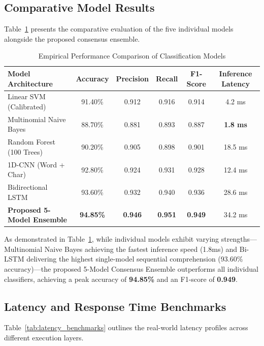 \documentclass[A4paper,12pt]{report}
\theoremstyle{plain}
\theoremstyle{definition}
\theoremstyle{remark}
\numberwithin{equation}{section}
\begin{document}
\subsection{Comparative Model Results}
Table~\ref{tab:model_results} presents the comparative evaluation of the five individual models alongside the proposed consensus ensemble.

\begin{table}[H]
\centering
\caption{Empirical Performance Comparison of Classification Models}
\label{tab:model_results}
\renewcommand{\arraystretch}{1.4}
\begin{tabular}{|l|c|c|c|c|c|}
\hline
\textbf{Model Architecture} & \textbf{Accuracy} & \textbf{Precision} & \textbf{Recall} & \textbf{F1-Score} & \textbf{Inference Latency} \\ \hline
Linear SVM (Calibrated) & 91.40\% & 0.912 & 0.916 & 0.914 & 4.2 ms \\ \hline
Multinomial Naive Bayes & 88.70\% & 0.881 & 0.893 & 0.887 & \textbf{1.8 ms} \\ \hline
Random Forest (100 Trees) & 90.20\% & 0.905 & 0.898 & 0.901 & 18.5 ms \\ \hline
1D-CNN (Word + Char) & 92.80\% & 0.924 & 0.931 & 0.928 & 12.4 ms \\ \hline
Bidirectional LSTM & 93.60\% & 0.932 & 0.940 & 0.936 & 28.6 ms \\ \hline
\textbf{Proposed 5-Model Ensemble} & \textbf{94.85\%} & \textbf{0.946} & \textbf{0.951} & \textbf{0.949} & 34.2 ms \\ \hline
\end{tabular}
\end{table}

As demonstrated in Table~\ref{tab:model_results}, while individual models exhibit varying strengths---Multinomial Naive Bayes achieving the fastest inference speed (1.8ms) and Bi-LSTM delivering the highest single-model sequential comprehension (93.60\% accuracy)---the proposed 5-Model Consensus Ensemble outperforms all individual classifiers, achieving a peak accuracy of \textbf{94.85\%} and an F1-score of \textbf{0.949}.

\subsection{Latency and Response Time Benchmarks}
Table~\ref{tab:latency_benchmarks} outlines the real-world latency profiles across different execution layers.
\end{document}
